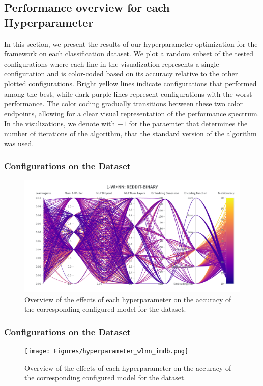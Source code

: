 \subsection{Performance overview for each Hyperparameter}
In this section, we present the results of our hyperparameter optimization for the \wlnn framework on each classification dataset. We plot a random subset of the tested configurations where each line in the visualization represents a single configuration and is color-coded based on its accuracy relative to the other plotted configurations. Bright yellow lines indicate configurations that performed among the best, while dark purple lines represent configurations with the worst performance. The color coding gradually transitions between these two color endpoints, allowing for a clear visual representation of the performance spectrum. In the visulizations, we denote with $-1$ for the paraemter that determines the number of iterations of the \wl algorithm, that the  standard version of the algorithm was used. 

\subsubsection{\wlnn Configurations on the \enzymes Dataset}
\begin{figure}[H]
    \centering
    \includegraphics[width=\textwidth, trim={0 75 0 150}, clip]{Figures/hyperparameter_wlnn_enzymes.png}
    \caption{Overview of the effects of each hyperparameter on the accuracy of the corresponding configured \wlnn model for the \enzymes dataset.}
\end{figure}

\subsubsection{\wlnn Configurations on the \imdb Dataset}
\begin{figure}[H]
    \centering
    \texttt{[image: Figures/hyperparameter\_wlnn\_imdb.png]}
    \caption{Overview of the effects of each hyperparameter on the accuracy of the corresponding configured \wlnn model for the \imdb dataset.}
\end{figure}
\clearpage

